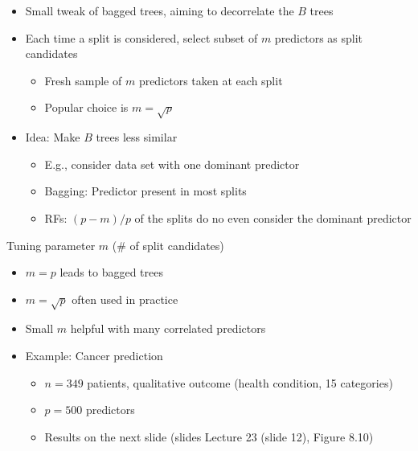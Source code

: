 \documentclass[11pt,a4paper,numbers=endperiod]{scrartcl}
\newcommand{\tit}[1]{\begin{large} \underline{\text{#1}}\end{large}}
\begin{document}
{\begin{itemize}
	\item Small tweak of bagged trees, aiming to decorrelate the $B$ trees
	\item Each time a split is considered, select subset of $m$ predictors as split candidates \begin{itemize}
		\item Fresh sample of $m$ predictors taken at each split
		\item Popular choice is $m = \sqrt{p}$
	\end{itemize}
	\item Idea: Make $B$ trees less similar \begin{itemize}
		\item E.g., consider data set with one dominant predictor
		\item Bagging: Predictor present in most splits
		\item  RFs: $(p-m)/p$ of the splits do no even consider the dominant predictor
	\end{itemize}
\end{itemize}

Tuning parameter $m$ (\# of split candidates) \begin{itemize}
	\item $m = p$ leads to bagged trees
	\item $m = \sqrt{p}$ often used in practice
	\item Small $m$ helpful with many correlated predictors
	\item Example: Cancer prediction \begin{itemize}
		\item $n = 349$ patients, qualitative outcome (health condition, 15 categories)
		\item $p = 500$ predictors
		\item Results on the next slide (slides Lecture 23 (slide 12), Figure 8.10)  
	\end{itemize}
\end{itemize}

\tit{Boosting}\\

}
\end{document}
